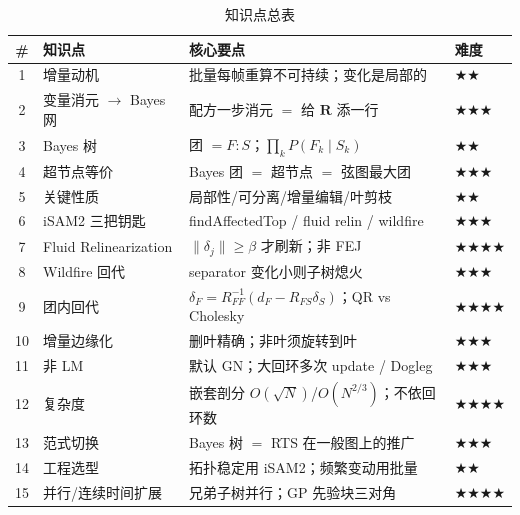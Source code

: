 \begin{table}[H]\centering\small
\caption{知识点总表}
\begin{tabular}{clll}
\toprule
\# & 知识点 & 核心要点 & 难度 \\
\midrule
1 & 增量动机 & 批量每帧重算不可持续；变化是局部的 & \(\bigstar\bigstar\) \\
2 & 变量消元 $\to$ Bayes 网 & 配方一步消元 $=$ 给 $\mathbf{R}$ 添一行 & \(\bigstar\bigstar\bigstar\) \\
3 & Bayes 树 & 团 $=F:S$；$\prod_k P(F_k\mid S_k)$ & \(\bigstar\bigstar\) \\
4 & 超节点等价 & Bayes 团 $=$ 超节点 $=$ 弦图最大团 & \(\bigstar\bigstar\bigstar\) \\
5 & 关键性质 & 局部性/可分离/增量编辑/叶剪枝 & \(\bigstar\bigstar\) \\
6 & iSAM2 三把钥匙 & findAffectedTop / fluid relin / wildfire & \(\bigstar\bigstar\bigstar\) \\
7 & Fluid Relinearization & $\|\delta_j\|\ge\beta$ 才刷新；非 FEJ & \(\bigstar\bigstar\bigstar\bigstar\) \\
8 & Wildfire 回代 & separator 变化小则子树熄火 & \(\bigstar\bigstar\bigstar\) \\
9 & 团内回代 & $\delta_F=R_{FF}^{-1}(d_F-R_{FS}\delta_S)$；QR vs Cholesky & \(\bigstar\bigstar\bigstar\bigstar\) \\
10 & 增量边缘化 & 删叶精确；非叶须旋转到叶 & \(\bigstar\bigstar\bigstar\) \\
11 & 非 LM & 默认 GN；大回环多次 update / Dogleg & \(\bigstar\bigstar\bigstar\) \\
12 & 复杂度 & 嵌套剖分 $O(\sqrt N)$/$O(N^{2/3})$；不依回环数 & \(\bigstar\bigstar\bigstar\bigstar\) \\
13 & 范式切换 & Bayes 树 $=$ RTS 在一般图上的推广 & \(\bigstar\bigstar\bigstar\) \\
14 & 工程选型 & 拓扑稳定用 iSAM2；频繁变动用批量 & \(\bigstar\bigstar\) \\
15 & 并行/连续时间扩展 & 兄弟子树并行；GP 先验块三对角 & \(\bigstar\bigstar\bigstar\bigstar\) \\
\bottomrule
\end{tabular}
\end{table}

